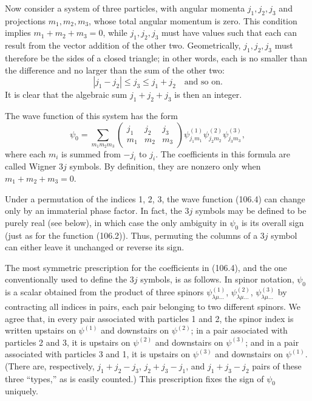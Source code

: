 Now consider a system of three particles, with angular momenta $j_1,j_2,j_3$ and projections $m_1,m_2,m_3$, whose total angular momentum is zero. This condition implies $m_1+m_2+m_3=0$, while $j_1,j_2,j_3$ must have values such that each can result from the vector addition of the other two. Geometrically, $j_1,j_2,j_3$ must therefore be the sides of a closed triangle; in other words, each is no smaller than the difference and no larger than the sum of the other two:
\[
 |j_1-j_2|\leq j_3\leq j_1+j_2\quad\text{and so on.}
\]
It is clear that the algebraic sum $j_1+j_2+j_3$ is then an integer.

The wave function of this system has the form
\begin{equation}
 \psi_0=\sum_{m_1m_2m_3}
 \begin{pmatrix}j_1&j_2&j_3\\m_1&m_2&m_3\end{pmatrix}
 \psi^{(1)}_{j_1m_1}\psi^{(2)}_{j_2m_2}\psi^{(3)}_{j_3m_3},
 \tag{106.4}
\end{equation}
where each $m_i$ is summed from $-j_i$ to $j_i$. The coefficients in this formula are called Wigner $3j$ symbols. By definition, they are nonzero only when $m_1+m_2+m_3=0$.

Under a permutation of the indices 1, 2, 3, the wave function (106.4) can change only by an immaterial phase factor. In fact, the $3j$ symbols may be defined to be purely real (see below), in which case the only ambiguity in $\psi_0$ is its overall sign (just as for the function (106.2)). Thus, permuting the columns of a $3j$ symbol can either leave it unchanged or reverse its sign.

The most symmetric prescription for the coefficients in (106.4), and the one conventionally used to define the $3j$ symbols, is as follows. In spinor notation, $\psi_0$ is a scalar obtained from the product of three spinors $\psi^{(1)}_{\lambda\mu\ldots}$, $\psi^{(2)}_{\lambda\mu\ldots}$, $\psi^{(3)}_{\lambda\mu\ldots}$ by contracting all indices in pairs, each pair belonging to two different spinors. We agree that, in every pair associated with particles 1 and 2, the spinor index is written upstairs on $\psi^{(1)}$ and downstairs on $\psi^{(2)}$; in a pair associated with particles 2 and 3, it is upstairs on $\psi^{(2)}$ and downstairs
on $\psi^{(3)}$; and in a pair associated with particles 3 and 1, it is upstairs on $\psi^{(3)}$ and downstairs on $\psi^{(1)}$. (There are, respectively, $j_1+j_2-j_3$, $j_2+j_3-j_1$, and $j_1+j_3-j_2$ pairs of these three ``types,'' as is easily counted.) This prescription fixes the sign of $\psi_0$ uniquely.

